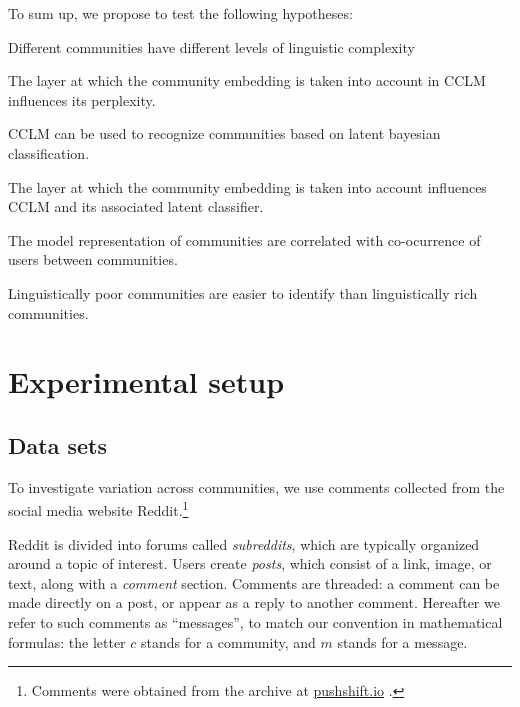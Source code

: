 \documentclass[11pt,a4paper]{article}
\newcommand\jp[1]{\todo[backgroundcolor=blue!10]{JP: #1}}
\begin{document}
To sum up, we propose to test the following hypotheses:
\begin{hypotheses}
\item Different communities have different levels of linguistic
  complexity
\item The layer at which the community embedding is taken into account
  in CCLM influences its perplexity.
\item CCLM can be used to recognize communities based on
  latent bayesian classification.
\item The layer at which the community embedding is taken into account
  influences CCLM and its associated latent classifier.
\item The model representation of communities are correlated with
  co-ocurrence of users between communities.
\item Linguistically poor communities are easier to identify than linguistically rich communities.
\end{hypotheses}

\jp{TODO: Outline of the paper.}

\section{Experimental setup}

\subsection{Data sets}

To investigate variation across communities, we use comments collected
from the social media website Reddit.\footnote{Comments were obtained
  from the archive at \href{https://pushshift.io/}{pushshift.io}
  \cite{Baumgartner2020}.} 

Reddit is divided into forums called \textit{subreddits}, 
which are typically organized around a topic of interest. 
Users create \textit{posts}, which consist of a link, image, 
or text, along with a \emph{comment} section. 
Comments are threaded: a comment can be made directly on a post,
or appear as a reply to another comment.
%
Hereafter we refer to such comments as ``messages'', to match our
convention in mathematical formulas: the letter $c$ stands for a
community, and $m$ stands for a message.
\end{document}
